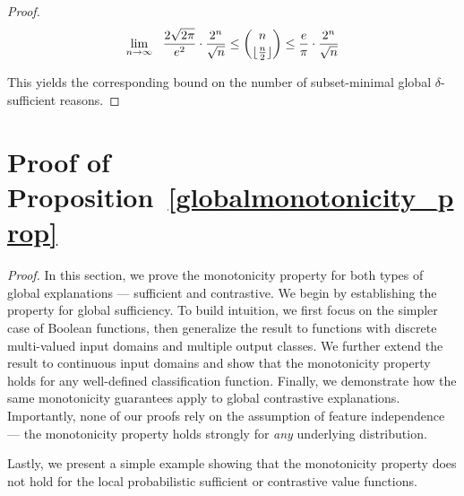 \documentclass{article}
\DeclarePairedDelimiter\floor{\lfloor}{\rfloor}
\begin{document}
\begin{proof}
\begin{equation}
    \lim_{n\to \infty} \ \ \frac{2\sqrt{2\pi}}{e^2}\cdot \frac{2^n}{\sqrt{n}} \leq \binom{n}{\floor{\frac{n}{2}}}\leq \frac{e}{\pi}\cdot \frac{2^n}{\sqrt{n}}
\end{equation}

This yields the corresponding bound on the number of subset-minimal global $\delta$-sufficient reasons.

\end{proof}



\section{Proof of Proposition~\ref{globalmonotonicity_prop}}
\label{globalmonotonicity_prop_appendix_sec}

\globalmonotonicity*


\label{monotonicity_proofs_appendix}

\emph{Proof.} In this section, we prove the monotonicity property for both types of global explanations --- sufficient and contrastive. We begin by establishing the property for global sufficiency. To build intuition, we first focus on the simpler case of Boolean functions, then generalize the result to functions with discrete multi-valued input domains and multiple output classes.
We further extend the result to continuous input domains and show that the monotonicity property holds for any well-defined classification function.
Finally, we demonstrate how the same monotonicity guarantees apply to global contrastive explanations. Importantly, none of our proofs rely on the assumption of feature independence --- the monotonicity property holds strongly for \emph{any} underlying distribution.

Lastly, we present a simple example showing that the monotonicity property does not hold for the local probabilistic sufficient or contrastive value functions.
\end{document}
